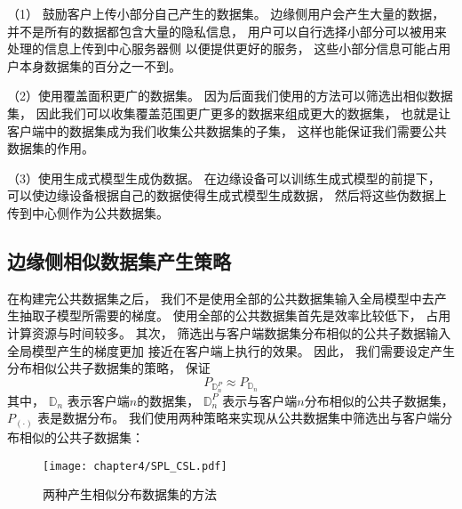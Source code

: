 （1） 鼓励客户上传小部分自己产生的数据集。
边缘侧用户会产生大量的数据，
并不是所有的数据都包含大量的隐私信息，
用户可以自行选择小部分可以被用来处理的信息上传到中心服务器侧
以便提供更好的服务，
这些小部分信息可能占用户本身数据集的百分之一不到。

（2）使用覆盖面积更广的数据集。
因为后面我们使用的方法可以筛选出相似数据集，
因此我们可以收集覆盖范围更广更多的数据来组成更大的数据集，
也就是让客户端中的数据集成为我们收集公共数据集的子集，
这样也能保证我们需要公共数据集的作用。

（3）使用生成式模型生成伪数据。
在边缘设备可以训练生成式模型的前提下，
可以使边缘设备根据自己的数据使得生成式模型生成数据，
然后将这些伪数据上传到中心侧作为公共数据集。


\subsection{边缘侧相似数据集产生策略}
在构建完公共数据集之后，
我们不是使用全部的公共数据集输入全局模型中去产生抽取子模型所需要的梯度。
使用全部的公共数据集首先是效率比较低下，
占用计算资源与时间较多。
其次，
筛选出与客户端数据集分布相似的公共子数据输入全局模型产生的梯度更加
接近在客户端上执行的效果。
因此，
我们需要设定产生分布相似公共子数据集的策略，
保证
\begin{equation}
    \label{eq:sameDataDis}
    P_{\mathbb{D}^P_n} \approx P_{\mathbb{D}_n}
\end{equation}
其中，
$\mathbb{D}_n$ 表示客户端$n$的数据集，
$\mathbb{D}^P_n$ 表示与客户端$n$分布相似的公共子数据集，
$P_{(\cdot)}$ 表是数据分布。
我们使用两种策略来实现从公共数据集中筛选出与客户端分布相似的公共子数据集：
\begin{figure}[thbp]
    \centering
    \texttt{[image: chapter4/SPL\_CSL.pdf]}
    \caption{\label{fig:4-2spl_csl}两种产生相似分布数据集的方法}
\end{figure}

